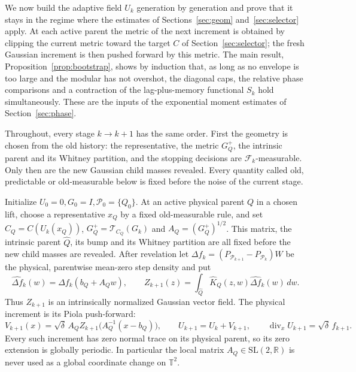 \documentclass[11pt]{article}
\theoremstyle{definition}
\theoremstyle{remark}
\numberwithin{equation}{section}
\newcommand{\T}{\mathbb T}
\newcommand{\F}{\mathcal F}
\newcommand{\pr}{\mathcal P}
\newcommand{\divv}{\operatorname{div}}
\begin{document}
We now build the adaptive field $U_k$ generation by generation and
prove that it stays in the regime where the estimates of
Sections~\ref{sec:geom} and~\ref{sec:selector} apply. At each active
parent the metric of the next increment is obtained by clipping the
current metric toward the target $C$ of Section~\ref{sec:selector};
the fresh Gaussian increment is then pushed forward by this metric.
The main result, Proposition~\ref{prop:bootstrap}, shows by induction
that, as long as no envelope is too large and the modular has not
overshot, the diagonal caps, the relative phase comparisons and a
contraction of the lag-plus-memory functional $S_k$ hold
simultaneously. These are the inputs of the exponential moment
estimates of Section~\ref{sec:phase}.

Throughout, every stage $k\to k+1$ has the same order. First the
geometry is chosen from the old history: the representative, the
metric $G_Q^+$, the intrinsic parent and its Whitney partition, and
the stopping decisions are $\F_k$-measurable. Only then are the new
Gaussian child masses revealed. Every quantity called old,
predictable or old-measurable below is fixed before the noise of the
current stage.

\label{not:birthmetric}
Initialize $U_0=0,G_0=I,\pr_0=\{Q_0\}$. At an active
physical parent $Q$ in a chosen lift, choose a representative $x_Q$
by a fixed old-measurable rule, and set
$C_Q=C(U_k(x_Q))$, $G_Q^+=\mathcal T_{C_Q}(G_k)$ and
$A_Q=(G_Q^+)^{1/2}$. This matrix, the intrinsic parent
$\widehat Q$, its bump and its Whitney partition are all fixed
before the new child masses are revealed. After revelation let
$\Delta f_k=(P_{\pr_{k+1}}-P_{\pr_k})W$ be the physical,
parentwise mean-zero step density and put
\label{not:intrinsicgauss}
\[
 \widehat{\Delta f}_k(w)=\Delta f_k(b_Q+A_Qw),\qquad
 Z_{k+1}(z)=\int_{\widehat Q}\widehat K_Q(z,w)
                        \widehat{\Delta f}_k(w)\,dw.
\]
Thus $Z_{k+1}$ is an intrinsically normalized Gaussian
vector field. The physical increment is its Piola push-forward:
\begin{equation}\label{eq:update}
 V_{k+1}(x)=\sqrt\delta\,A_Q
       Z_{k+1}\bigl(A_Q^{-1}(x-b_Q)\bigr),\qquad
 U_{k+1}=U_k+V_{k+1},\qquad
 \divv_x U_{k+1}=\sqrt\delta\,f_{k+1}.
\end{equation}
Every such increment has zero normal trace on its physical parent,
so its zero extension is globally periodic. In particular the local
matrix $A_Q\in\mathrm{SL}(2,\mathbb R)$ is never used as a global
coordinate change on $\T^2$.
\end{document}
